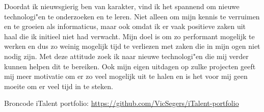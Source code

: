Doordat ik nieuwsgierig ben van karakter, vind ik het spannend om nieuwe technologi"en te onderzoeken en te leren. Niet alleen om mijn kennis te verruimen en te groeien als informaticus, maar ook omdat ik er vaak positieve zaken uit haal die ik initieel niet had verwacht. Mijn doel is om zo performant mogelijk te werken en dus zo weinig mogelijk tijd te verliezen met zaken die in mijn ogen niet nodig zijn. Met deze attitude zoek ik naar nieuwe technologi"en die mij verder kunnen helpen dit te bereiken. Ook mijn eigen uitdagen op zulke projecten geeft mij meer motivatie om er zo veel mogelijk uit te halen en is het voor mij geen moeite om er veel tijd in te steken.

Broncode iTalent portfolio: \url{https://github.com/VicSegers/iTalent-portfolio}